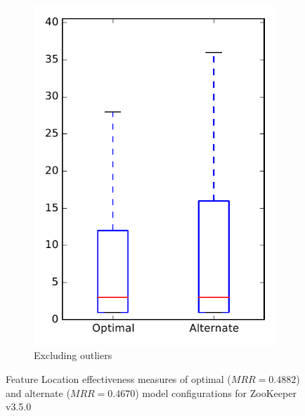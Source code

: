 \begin{figure}
\begin{subfigure}{.4\textwidth}
        \includegraphics[height=0.4\textheight]{figures/combo/flt_rq1_zookeeper_no_outlier}
        \caption{Excluding outliers}\label{fig:combo:flt:rq1:zookeeper_no_outlier}
    \end{subfigure}
\caption[Feature Location effectiveness measures of optimal and alternate model configurations for ZooKeeper v3.5.0]%
{Feature Location effectiveness measures of optimal ($MRR=0.4882$) and alternate ($MRR=0.4670$) model configurations for ZooKeeper v3.5.0}
\label{fig:combo:flt:rq1:zookeeper}
\end{figure}
